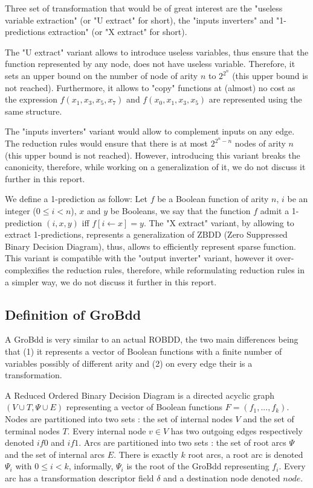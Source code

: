 \documentclass[a4paper,10pt]{article}
\begin{document}
Three set of transformation that would be of great interest are the "useless variable extraction" (or "U extract" for short), the "inputs inverters" and "1-predictions extraction" (or "X extract" for short).


The "U extract" variant allows to introduce useless variables, thus ensure that the function represented by any node, does not have useless variable.
Therefore, it sets an upper bound on the number of node of arity $n$ to $2^{2^n}$ (this upper bound is not reached).
Furthermore, it allows to "copy" functions at (almost) no cost as the expression $f(x_1, x_3, x_5, x_7)$ and $f(x_0, x_1, x_3, x_5)$ are represented using the same structure.


The "inputs inverters" variant would allow to complement inputs on any edge.
The reduction rules would ensure that there is at most $2^{2^n-n}$ nodes of arity $n$ (this upper bound is not reached).
However, introducing this variant breaks the canonicity, therefore, while working on a generalization of it, we do not discuss it further in this report.

We define a 1-prediction as follow:
Let $f$ be a Boolean function of arity $n$, $i$ be an integer ($0\leq i < n$), $x$ and $y$ be Booleans, we say that the function $f$ admit a 1-prediction $(i, x, y)$ iff $f[i\leftarrow x] = y$.
The "X extract" variant, by allowing to extract 1-predictions, represents a generalization of ZBDD (Zero Suppressed Binary Decision Diagram), thus, allows to efficiently represent sparse function.
This variant is compatible with the "output inverter" variant, however it over-complexifies the reduction rules, therefore, while reformulating reduction rules in a simpler way, we do not discuss it further in this report.


\subsection{Definition of GroBdd}

A GroBdd is very similar to an actual ROBDD, the two main differences being that (1) it represents a vector of Boolean functions with a finite number of variables possibly of different arity and (2) on every edge their is a transformation.

A Reduced Ordered Binary Decision Diagram is a directed acyclic graph $(V\cup T, \Psi \cup E)$ representing a vector of Boolean functions $F=(f_1, ..., f_k)$.
Nodes are partitioned into two sets : the set of internal nodes $V$ and the set of terminal nodes $T$.
Every internal node $v\in V$ has two outgoing edges respectively denoted $if0$ and $if1$.
Arcs are partitioned into two sets : the set of root arcs $\Psi$ and the set of internal arcs $E$.
There is exactly $k$ root arcs, a root arc is denoted $\Psi_i$ with $0\leq i < k$, informally, $\Psi_i$ is the root of the GroBdd representing $f_i$.
Every arc has a transformation descriptor field $\delta$ and a destination node denoted $node$.
\end{document}

